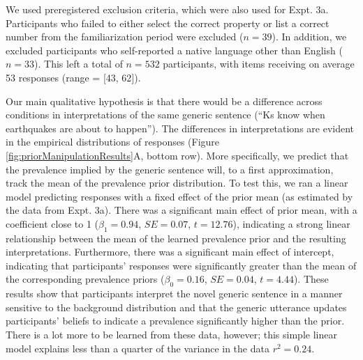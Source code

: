 \documentclass[,man,floatsintext]{apa6}
\theoremstyle{definition}
\theoremstyle{definition}
\theoremstyle{definition}
\theoremstyle{remark}
\begin{document}
We used preregistered exclusion criteria, which were also used for Expt.
3a. Participants who failed to either select the correct property or
list a correct number from the familiarization period were excluded
(\(n = 39\)). In addition, we excluded participants who self-reported a
native language other than English (\(n = 33\)). This left a total of
\(n = 532\) participants, with items receiving on average 53 responses
(range = {[}43, 62{]}).

Our main qualitative hypothesis is that there would be a difference
across conditions in interpretations of the same generic sentence
(\enquote{Ks know when earthquakes are about to happen}). The
differences in interpretations are evident in the empirical
distributions of responses (Figure \ref{fig:priorManipulationResults}A,
bottom row). More specifically, we predict that the prevalence implied
by the generic sentence will, to a first approximation, track the mean
of the prevalence prior distribution. To test this, we ran a linear
model predicting responses with a fixed effect of the prior mean (as
estimated by the data from Expt. 3a). There was a significant main
effect of prior mean, with a coefficient close to 1 (\(\beta_1 = 0.94\),
\(SE=0.07\), \(t = 12.76\)), indicating a strong linear relationship
between the mean of the learned prevalence prior and the resulting
interpretations. Furthermore, there was a significant main effect of
intercept, indicating that participants' responses were significantly
greater than the mean of the corresponding prevalence priors
(\(\beta_0 = 0.16\), \(SE=0.04\), \(t = 4.44\)). These results show that
participants interpret the novel generic sentence in a manner sensitive
to the background distribution and that the generic utterance updates
participants' beliefs to indicate a prevalence significantly higher than
the prior. There is a lot more to be learned from these data, however;
this simple linear model explains less than a quarter of the variance in
the data \(r^2 = 0.24\).
\end{document}
